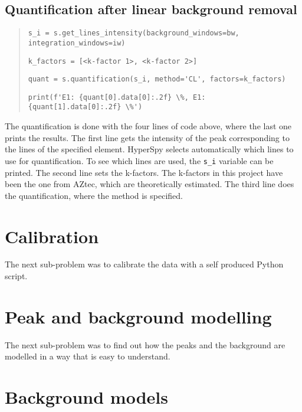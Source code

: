 \subsection{Quantification after linear background removal}
\label{sec:results:steps:quantification:linear}

\begin{quote}
    \verb|s_i = s.get_lines_intensity(background_windows=bw, integration_windows=iw)|

    \verb|k_factors = [<k-factor 1>, <k-factor 2>]  |

    \verb|quant = s.quantification(s_i, method='CL', factors=k_factors)|

    \verb|print(f'E1: {quant[0].data[0]:.2f} \%, E1: {quant[1].data[0]:.2f} \%')|
\end{quote}

The quantification is done with the four lines of code above, where the last one prints the results.
The first line gets the intensity of the peak corresponding to the lines of the specified element.
HyperSpy selects automatically which lines to use for quantification.
To see which lines are used, the \verb|s_i| variable can be printed.
The second line sets the k-factors.
The k-factors in this project have been the one from AZtec, which are theoretically estimated.
The third line does the quantification, where the method is specified.

%
%
\section{Calibration}
\label{sec:results:calibration}

The next sub-problem was to calibrate the data with a self produced Python script.


%
%
\section{Peak and background modelling}
\label{sec:results:modelling}

The next sub-problem was to find out how the peaks and the background are modelled in a way that is easy to understand.

%
%
\section{Background models}
\label{sec:results:background}

